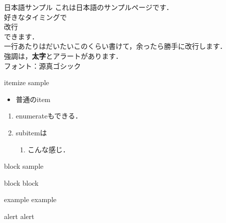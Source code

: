 \documentclass[aspectratio=1610,14pt]{beamer}
\begin{document}
\begin{frame}{日本語サンプル}
    これは日本語のサンプルページです．\\
    好きなタイミングで\\
    \alert{改行}\\
    できます．\\
    一行あたりはだいたいこのくらい書けて，余ったら勝手に改行します．\\
    強調は，\textbf{太字}と\alert{アラート}があります．\\
    フォント：源真ゴシック
\end{frame}

\begin{frame}{itemize sample}
    \begin{itemize}
        \item{普通のitem}
            \begin{itemize}
            \end{itemize}
    \end{itemize}
    \begin{enumerate}
        \item{enumerateもできる．}
        \item{subitemは}
            \begin{enumerate}
                \item{こんな感じ．}
            \end{enumerate}
    \end{enumerate}
\end{frame}

\begin{frame}{block sample}
    \begin{block}{block}
        block
    \end{block}
    \begin{exampleblock}{example}
        example
    \end{exampleblock}
    \begin{alertblock}{alert}
        alert
    \end{alertblock}
\end{frame}
\end{document}
